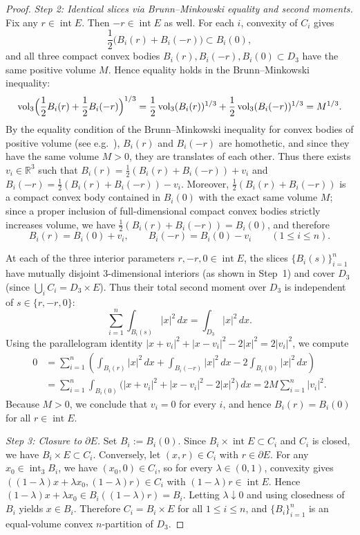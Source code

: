 \documentclass[11pt,a4paper]{amsart}
\numberwithin{equation}{section}
\theoremstyle{definition}
\newcommand{\R}{\mathbb{R}}
\newcommand{\inte}{\operatorname{int}}
\newcommand{\vol}{\operatorname{vol}}
\begin{document}
\begin{proof}
\emph{Step 2: Identical slices via Brunn--Minkowski equality and second moments.}
Fix any $r \in \inte E$. Then $-r \in \inte E$ as well. For each $i$, convexity of $C_i$ gives
\[
\frac{1}{2}\bigl(B_i(r) + B_i(-r)\bigr) \subset B_i(0),
\]
and all three compact convex bodies $B_i(r), B_i(-r), B_i(0) \subset D_3$ have the same positive volume $M$. Hence equality holds in the Brunn--Minkowski inequality:
\[
\vol_3\Bigl(\frac{1}{2} B_i(r) + \frac{1}{2} B_i(-r)\Bigr)^{1/3} = \frac{1}{2} \vol_3(B_i(r))^{1/3} + \frac{1}{2} \vol_3(B_i(-r))^{1/3} = M^{1/3}.
\]
By the equality condition of the Brunn--Minkowski inequality for convex bodies of positive volume (see e.g.~\cite[Theorem~7.1.1]{Schneider2014}), $B_i(r)$ and $B_i(-r)$ are homothetic, and since they have the same volume $M > 0$, they are translates of each other. Thus there exists $v_i \in \R^3$ such that $B_i(r) = \frac{1}{2}(B_i(r)+B_i(-r)) + v_i$ and $B_i(-r) = \frac{1}{2}(B_i(r)+B_i(-r)) - v_i$. Moreover, $\frac{1}{2}(B_i(r) + B_i(-r))$ is a compact convex body contained in $B_i(0)$ with the exact same volume $M$; since a proper inclusion of full-dimensional compact convex bodies strictly increases volume, we have $\frac{1}{2}(B_i(r) + B_i(-r)) = B_i(0)$, and therefore
\[
B_i(r) = B_i(0) + v_i, \qquad B_i(-r) = B_i(0) - v_i \qquad (1 \le i \le n).
\]

At each of the three interior parameters $r, -r, 0 \in \inte E$, the slices $\{B_i(s)\}_{i=1}^n$ have mutually disjoint $3$-dimensional interiors (as shown in Step~1) and cover $D_3$ (since $\bigcup_i C_i = D_3 \times E$). Thus their total second moment over $D_3$ is independent of $s \in \{r, -r, 0\}$:
\[
\sum_{i=1}^n \int_{B_i(s)} |x|^2 \, dx = \int_{D_3} |x|^2 \, dx.
\]
Using the parallelogram identity $|x + v_i|^2 + |x - v_i|^2 - 2|x|^2 = 2|v_i|^2$, we compute
\begin{align*}
0 &= \sum_{i=1}^n \left(\int_{B_i(r)} |x|^2 \, dx + \int_{B_i(-r)} |x|^2 \, dx - 2 \int_{B_i(0)} |x|^2 \, dx\right) \\
  &= \sum_{i=1}^n \int_{B_i(0)} \bigl(|x + v_i|^2 + |x - v_i|^2 - 2|x|^2\bigr)\, dx
   = 2 M \sum_{i=1}^n |v_i|^2.
\end{align*}
Because $M > 0$, we conclude that $v_i = 0$ for every $i$, and hence $B_i(r) = B_i(0)$ for all $r \in \inte E$.

\emph{Step 3: Closure to $\partial E$.}
Set $B_i := B_i(0)$. Since $B_i \times \inte E \subset C_i$ and $C_i$ is closed, we have $B_i \times E \subset C_i$. Conversely, let $(x, r) \in C_i$ with $r \in \partial E$. For any $x_0 \in \inte_3 B_i$, we have $(x_0, 0) \in C_i$, so for every $\lambda \in (0, 1)$, convexity gives $((1-\lambda) x + \lambda x_0, (1-\lambda) r) \in C_i$ with $(1-\lambda) r \in \inte E$. Hence $(1-\lambda) x + \lambda x_0 \in B_i((1-\lambda)r) = B_i$. Letting $\lambda \downarrow 0$ and using closedness of $B_i$ yields $x \in B_i$. Therefore $C_i = B_i \times E$ for all $1 \le i \le n$, and $\{B_i\}_{i=1}^n$ is an equal-volume convex $n$-partition of $D_3$.
\end{proof}
\end{document}
